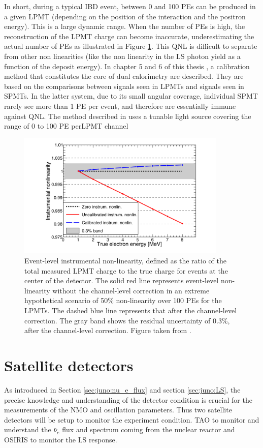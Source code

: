 \documentclass[../main.tex]{subfiles}
\begin{document}
In short, during a typical IBD event, between 0 and 100 PEs can be produced in a given LPMT (depending on the position of the interaction and the positron energy). This is a large dynamic range. When the number of PEs is high, the reconstruction of the LPMT charge can become inaccurate, underestimating the actual number of PEs as illustrated in Figure \ref{fig:juno:instr_nl}. This QNL is difficult to separate from other non linearities (like the non linearity in the LS photon yield as a function of the deposit energy). In chapter 5 and 6 of this thesis \cite{han_dual_2021}, a calibration method that constitutes the core of dual calorimetry are described.  They are based on the comparisons between signals seen in LPMTs and signals seen in SPMTs. In the latter system, due to its small angular  coverage, individual SPMT rarely see more than 1 PE per event, and therefore are essentially immune  against QNL. The method described in \cite{han_dual_2021} uses a tunable light source covering the range of 0 to 100 PE perLPMT channel

\begin{figure}[ht]
  \centering
  \includegraphics[height=6cm]{images/juno/instr_non_linearity.png}
  \caption{Event-level instrumental non-linearity, defined as the ratio of the total measured LPMT charge to the true charge for events at the center of the detector. The solid red line represents event-level non-linearity without the channel-level correction in an extreme hypothetical scenario of 50\% non-linearity over 100 PEs for the LPMTs. The dashed blue line represents that after the channel-level correction. The gray band shows the residual uncertainty of 0.3\%, after the channel-level correction. Figure taken from \cite{juno_collaboration_calibration_2021}.}
  \label{fig:juno:instr_nl}
\end{figure}


\section{Satellite detectors}
As introduced in Section \ref{sec:juno:nu_e_flux} and section \ref{sec:juno:LS}, the precise knowledge and understanding of the detector condition is crucial for the measurements of the NMO and oscillation parameters. Thus two satellite detectors will be setup to monitor the experiment condition. TAO to monitor and understand the $\bar{\nu}_e$ flux and spectrum coming from the nuclear reactor and OSIRIS to monitor the LS response.
\end{document}
